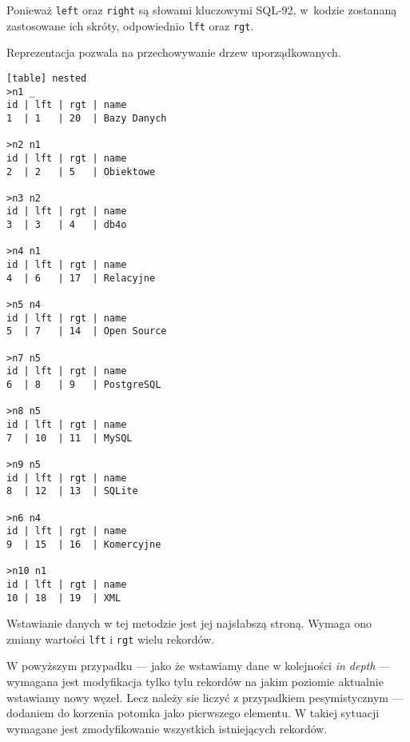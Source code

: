 Ponieważ \texttt{left} oraz \texttt{right} są słowami kluczowymi SQL-92,
w~kodzie zostananą zastosowane ich skróty, odpowiednio \texttt{lft} oraz \texttt{rgt}.

Reprezentacja pozwala na przechowywanie drzew uporządkowanych.


\begin{verbatim}[table] nested
>n1 _
id | lft | rgt | name
1  | 1   | 20  | Bazy Danych

>n2 n1
id | lft | rgt | name
2  | 2   | 5   | Obiektowe

>n3 n2
id | lft | rgt | name
3  | 3   | 4   | db4o

>n4 n1
id | lft | rgt | name
4  | 6   | 17  | Relacyjne

>n5 n4
id | lft | rgt | name
5  | 7   | 14  | Open Source

>n7 n5
id | lft | rgt | name
6  | 8   | 9   | PostgreSQL

>n8 n5
id | lft | rgt | name
7  | 10  | 11  | MySQL

>n9 n5
id | lft | rgt | name
8  | 12  | 13  | SQLite

>n6 n4
id | lft | rgt | name
9  | 15  | 16  | Komercyjne

>n10 n1
id | lft | rgt | name
10 | 18  | 19  | XML

\end{verbatim}







Wstawianie danych w tej metodzie jest jej najsłabszą stroną.
Wymaga ono zmiany wartości \texttt{lft} i \texttt{rgt} wielu rekordów.

W powyższym przypadku
--- jako że wstawiamy dane w kolejności \emph{in depth} ---
wymagana jest modyfikacja tylko tylu rekordów na jakim poziomie aktualnie wstawiamy nowy węzeł.
Lecz należy sie liczyć z przypadkiem pesymistycznym --- dodaniem do korzenia potomka jako pierwszego elementu.
W takiej sytuacji wymagane jest zmodyfikowanie wszystkich istniejących rekordów.

